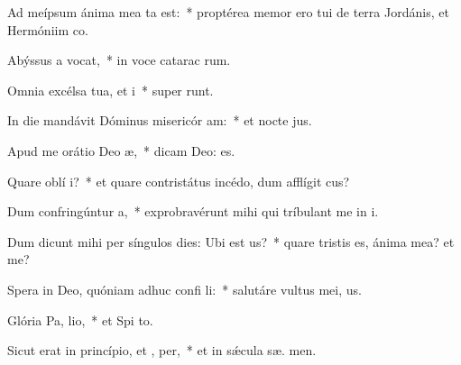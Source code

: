 \item Ad meípsum ánima mea ta est:~* proptérea memor ero tui de terra Jordánis, et Hermóniim   co.
\item Abýssus a vocat,~* in voce catarac rum.
\item Omnia excélsa tua, et  i~* super  runt.
\item In die mandávit Dóminus misericór am:~* et nocte  jus.
\item Apud me orátio Deo  æ,~* dicam Deo:   es.
\item Quare oblí  i?~* et quare contristátus incédo, dum afflígit  cus?
\item Dum confringúntur  a,~* exprobravérunt mihi qui tríbulant me in i.
\item Dum dicunt mihi per síngulos dies: Ubi est  us?~* quare tristis es, ánima mea? et   me?
\item Spera in Deo, quóniam adhuc confi li:~* salutáre vultus mei,   us.
\item Glória Pa,  lio,~* et Spi to.
\item Sicut erat in princípio, et ,  per,~* et in sǽcula sæ. men.
